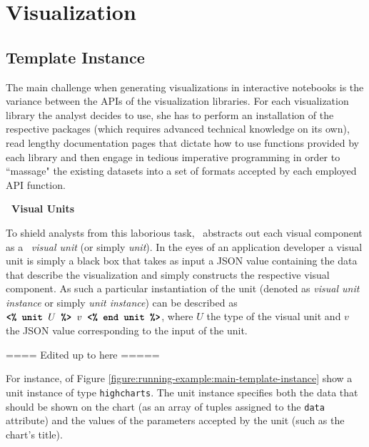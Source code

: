\section{Visualization}
\label{section:visualization}







\subsection{Template Instance}
\label{section:template-instance}



The main challenge when generating visualizations in interactive notebooks is the variance between the APIs of the visualization libraries. For each visualization library the analyst decides to use, she has to perform an installation of the respective packages (which requires advanced technical knowledge on its own), read lengthy documentation pages that dictate how to use functions provided by each library and then engage in tedious imperative programming in order to ``massage" the existing datasets into a set of formats accepted by each employed API function.


\noindent \textbf{\projname\ Visual Units} 

\noindent To shield analysts from this laborious task, \projname\ abstracts out each visual component as a \projname\ \emph{visual unit} (or simply \emph{unit}). In the eyes of an application developer a visual unit is simply a black box that takes as input a JSON value containing the data that describe the visualization and simply constructs the respective visual component. As such a particular instantiation of the unit (denoted as \emph{visual unit instance} or simply \emph{unit instance}) can be described as $\texttt{\textbf{<\% unit }} U \texttt{\textbf{ \%> }} v \texttt{\textbf{ <\% end unit \%>}}$, where $U$ the type of the visual unit and $v$ the JSON value corresponding to the input of the unit. 


==== Edited up to here =====

For instance,  of Figure \ref{figure:running-example:main-template-instance} show a unit instance of type \texttt{highcharts}. The unit instance specifies both the data that should be shown on the chart (as an array of tuples assigned to the \texttt{data} attribute) and the values of the parameters accepted by the unit (such as the chart's title).


